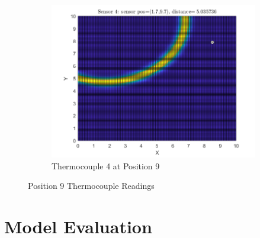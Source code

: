 \documentclass[12pt]{article}
\begin{document}
\begin{figure}[H]
\begin{subfigure}[h]{0.4\textwidth}
        \includegraphics[width=\textwidth]{images/P9S4.png}
        \caption{Thermocouple 4 at Position 9}
        \label{fig:P9S4}
    \end{subfigure}
\caption{Position 9 Thermocouple Readings}
\label{fig:P9}
\end{figure}


\section{Model Evaluation}
\end{document}
